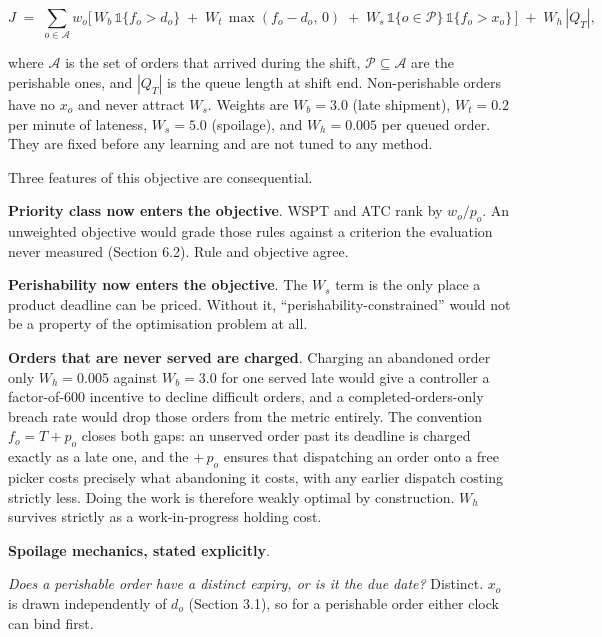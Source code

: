 \documentclass[review,3p,times]{elsarticle}
\theoremstyle{definition}
\begin{document}
\[ J \;=\; \sum_{o \in \mathcal{A}} w_o \Big[\, W_{b}\,\mathbb{1}\{f_o > d_o\} \;+\; W_{t}\,\max(f_o - d_o,\,0) \;+\; W_{s}\,\mathbb{1}\{o\in\mathcal{P}\}\,\mathbb{1}\{f_o > x_o\} \,\Big] \;+\; W_{h}\,|Q_T| , \]

where \(\mathcal{A}\) is the set of orders that arrived during the
shift, \(\mathcal{P}\subseteq\mathcal{A}\) are the perishable ones, and
\(|Q_T|\) is the queue length at shift end. Non-perishable orders have
no \(x_o\) and never attract \(W_s\). Weights are \(W_{b} = 3.0\) (late
shipment), \(W_{t} = 0.2\) per minute of lateness, \(W_{s} = 5.0\)
(spoilage), and \(W_{h} = 0.005\) per queued order. They are fixed
before any learning and are not tuned to any method.

Three features of this objective are consequential.

\textbf{Priority class now enters the objective}. WSPT and ATC rank by
\(w_o/p_o\). An unweighted objective would grade those rules against a
criterion the evaluation never measured (Section 6.2). Rule and
objective agree.

\textbf{Perishability now enters the objective}. The \(W_s\) term is the
only place a product deadline can be priced. Without it,
``perishability-constrained'' would not be a property of the
optimisation problem at all.

\textbf{Orders that are never served are charged}. Charging an abandoned
order only \(W_{h} = 0.005\) against \(W_{b} = 3.0\) for one served late
would give a controller a factor-of-600 incentive to decline difficult
orders, and a completed-orders-only breach rate would drop those orders
from the metric entirely. The convention \(f_o = T + p_o\) closes both
gaps: an unserved order past its deadline is charged exactly as a late
one, and the \(+\,p_o\) ensures that dispatching an order onto a free
picker costs precisely what abandoning it costs, with any earlier
dispatch costing strictly less. Doing the work is therefore weakly
optimal by construction. \(W_h\) survives strictly as a work-in-progress
holding cost.

\textbf{Spoilage mechanics, stated explicitly}.

\emph{Does a perishable order have a distinct expiry, or is it the due
date?} Distinct. \(x_o\) is drawn independently of \(d_o\) (Section
3.1), so for a perishable order either clock can bind first.
\end{document}
